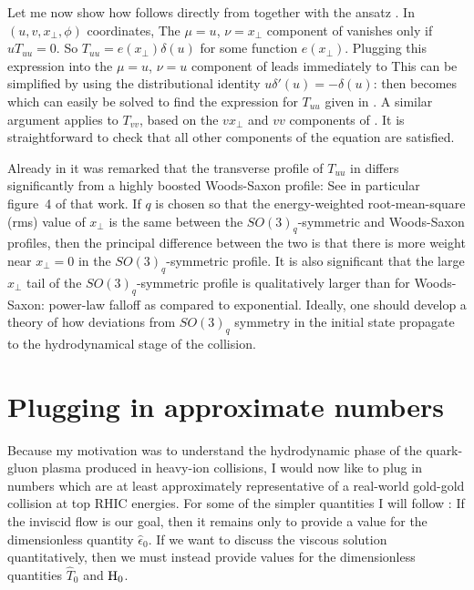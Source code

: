 \documentclass[12pt]{article}
\begin{document}
Let me now show how  follows directly from  together with the ansatz .  In $(u,v,x_\perp,\phi)$ coordinates,
The $\mu=u$, $\nu=x_\perp$ component of  vanishes only if $u T_{uu} = 0$.  So $T_{uu} = e(x_\perp) \delta(u)$ for some function $e(x_\perp)$.  Plugging this expression into the $\mu=u$, $\nu=u$ component of  leads immediately to
This can be simplified by using the distributional identity $u \delta'(u) = -\delta(u)$: then  becomes
which can easily be solved to find the expression for $T_{uu}$ given in .  A similar argument applies to $T_{vv}$, based on the $vx_\perp$ and $vv$ components of .  It is straightforward to check that all other components of the equation  are satisfied.

Already in \cite{Gubser:2008pc} it was remarked that the transverse profile of $T_{uu}$ in  differs significantly from a highly boosted Woods-Saxon profile: See in particular figure~4 of that work.  If $q$ is chosen so that the energy-weighted root-mean-square (rms) value of $x_\perp$ is the same between the $SO(3)_q$-symmetric and Woods-Saxon profiles, then the principal difference between the two is that there is more weight near $x_\perp=0$ in the $SO(3)_q$-symmetric profile.  It is also significant that the large $x_\perp$ tail of the $SO(3)_q$-symmetric profile is qualitatively larger than for Woods-Saxon: power-law falloff as compared to exponential.  Ideally, one should develop a theory of how deviations from $SO(3)_q$ symmetry in the initial state propagate to the hydrodynamical stage of the collision.



\section{Plugging in approximate numbers}
\label{NUMBERS}

Because my motivation was to understand the hydrodynamic phase of the quark-gluon plasma produced in heavy-ion collisions, I would now like to plug in numbers which are at least approximately representative of a real-world gold-gold collision at top RHIC energies.  For some of the simpler quantities I will follow \cite{Gubser:2008pc}:
If the inviscid flow  is our goal, then it remains only to provide a value for the dimensionless quantity $\hat\epsilon_0$.  If we want to discuss the viscous solution  quantitatively, then we must instead provide values for the dimensionless quantities $\hat{T}_0$ and ${\rm H}_0$.  
\end{document}
